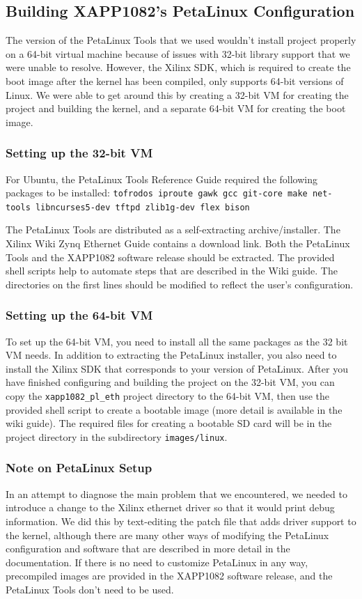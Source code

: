 \documentclass[12pt]{report}
\begin{document}
\subsection{Building XAPP1082's PetaLinux Configuration}
The version of the PetaLinux Tools that we used wouldn't install project properly on a 64-bit virtual machine because of issues with 32-bit library support that we were unable to resolve. However, the Xilinx SDK, which is required to create the boot image after the kernel has been compiled, only supports 64-bit versions of Linux. We were able to get around this by creating a 32-bit VM for creating the project and building the kernel, and a separate 64-bit VM for creating the boot image.

\subsubsection{Setting up the 32-bit VM}
For Ubuntu, the PetaLinux Tools Reference Guide required the following packages to be installed:
\newline \texttt{tofrodos iproute gawk gcc git-core make net-tools libncurses5-dev tftpd zlib1g-dev flex bison}

The PetaLinux Tools are distributed as a self-extracting archive/installer. The Xilinx Wiki Zynq Ethernet Guide contains a download link. Both the PetaLinux Tools and the XAPP1082 software release should be extracted. The provided shell scripts help to automate steps that are described in the Wiki guide. The directories on the first lines should be modified to reflect the user's configuration.


\subsubsection{Setting up the 64-bit VM}
To set up the 64-bit VM, you need to install all the same packages as the 32 bit VM needs. In addition to extracting the PetaLinux installer, you also need to install the Xilinx SDK that corresponds to your version of PetaLinux. After you have finished configuring and building the project on the 32-bit VM, you can copy the \texttt{xapp1082\_pl\_eth} project directory to the 64-bit VM, then use the provided shell script to create a bootable image (more detail is available in the wiki guide). The required files for creating a bootable SD card will be in the project directory in the subdirectory \texttt{images/linux}.

\subsubsection{Note on PetaLinux Setup}
In an attempt to diagnose the main problem that we encountered, we needed to introduce a change to the Xilinx ethernet driver so that it would print debug information. We did this by text-editing the patch file that adds driver support to the kernel, although there are many other ways of modifying the PetaLinux configuration and software that are described in more detail in the documentation. If there is no need to customize PetaLinux in any way, precompiled images are provided in the XAPP1082 software release, and the PetaLinux Tools don't need to be used.
\end{document}
